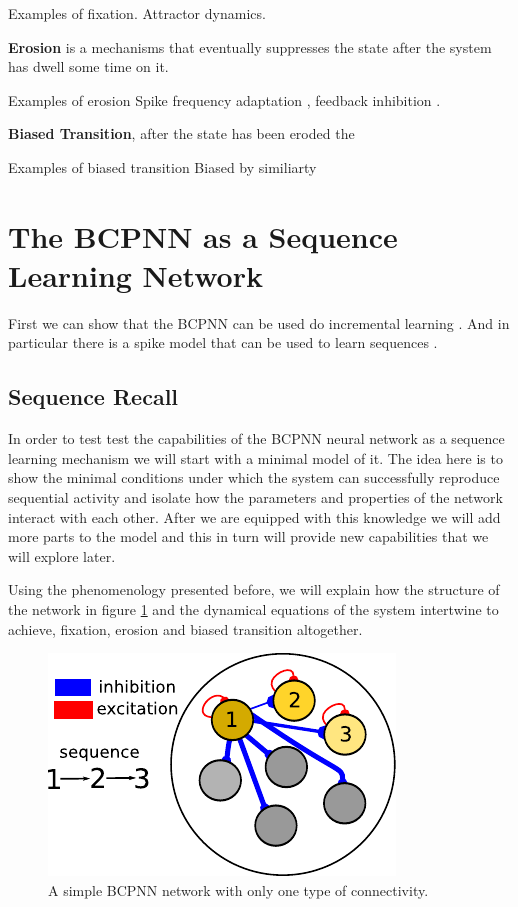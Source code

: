 \documentclass[10pt,a4paper]{article}
\begin{document}
Examples of fixation. Attractor dynamics.

\textbf{Erosion} is a mechanisms that eventually suppresses the state after the system has dwell some time on it. 

Examples of erosion 
Spike frequency adaptation \cite{roach2016memory}, feedback inhibition \cite{recanatesi2017memory}. 

\textbf{Biased Transition}, after the state has been eroded the 

Examples of biased transition
Biased by similiarty \cite{recanatesi2017memory}


\section{The BCPNN as a Sequence Learning Network}
First we can show that the BCPNN can be used do incremental learning \cite{sandberg2002bayesian}. And in particular there is a spike model that can be used to learn sequences \cite{tully2016spike}. 

\subsection{Sequence Recall}
In order to test test the capabilities of the BCPNN neural network as a sequence learning mechanism we will start with a minimal model of it. The idea here is to show the minimal conditions under which the system can successfully reproduce sequential activity and isolate how the parameters and properties of the network interact with each other. After we are equipped with this knowledge we will add more parts to the model and this in turn will provide new capabilities that we will explore later. 

Using the phenomenology presented before, we will explain how the structure of the network in figure \ref{fig:bcpnn_simple_network} and the dynamical equations of the system intertwine to achieve, fixation, erosion and biased transition altogether. 

\begin{figure}[H]
\centering
\includegraphics[scale=1.40]{simple_BCPNN.pdf}
\caption{A simple BCPNN network with only one type of connectivity.}
\label{fig:bcpnn_simple_network}
\end{figure}
\end{document}
